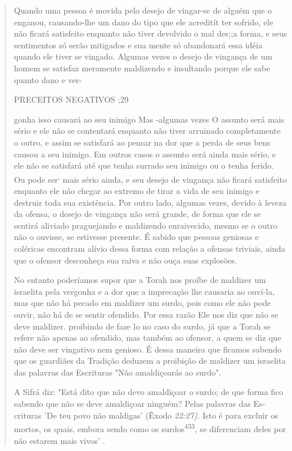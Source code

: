 \begin{quote}
Quando uma pessoa é movida pelo desejo de vingar-se de alguém que o
enganou, causando-lhe um dano do tipo que ele acreditít ter sofrido, ele
não ficará satisfeito enquanto não tiver devolvido o mal des;;a forma, e
seus sentimentos só serão mitigados e sua mente só abandonará essa idéia
quando ele tiver se vingado. Algumas vezes o desejo de vingança de um
homem se sa­tisfaz meramente maldizendo e insultando porque ele sabe
quanto dano e ver-

PRECEITOS NEGATIVOS ;29

gonha isso causará ao seu inimigo Mas -algumas vezes O assunto será mais
sério e ele não se contentará enquanto não tiver arruinado completamente
o outro, e assim se satisfará ao pensar na dor que a perda de seus bens
causou a seu inimigo. Em outros casos o assunto será ainda mais sério, e
ele não se satisfará até que tenha surrado seu inimigo ou o tenha
ferido. Ou pode ser\textsuperscript{,} mais sério ainda, e seu desejo de
vingança não ficará satisfeito enquanto ele não chegar ao extremo de
tirar a vida de seu inimigo e destruir toda sua existência. Por outro
lado, algumas vezes, devido à leveza da ofensa, o desejo de vingança não
será grande, de forma que ele se sentirá aliviado praguejando e
maldizendo enraivecido, mesmo se o outro não o ouvisse, se estivesse
pre­sente. É sabido que pessoas geniosas e coléricas encontram alívio
dessa forma com relação a ofensas triviais, ainda que o ofensor
desconheça sua raiva e não ouça suas explosões.

No entanto poderíamos supor que a Torah nos proíbe de maldizer um
israelita pela vergonha e a dor que a imprecação lhe causaria ao
ouví-la, mas que não há pecado em maldizer um surdo, pois como ele não
pode ouvir, não há de se sentir ofendido. Por essa razão Ele nos diz que
não se deve maldi­zer. proibindo de faze lo no caso do surdo, já que a
Torah se refere não apenas ao ofendido, mas também ao ofensor, a quem se
diz que não deve ser vingati­vo nem genioso. É dessa maneira que ficamos
sabendo que os guardiães da Tra­dição deduzem a proibição de maldizer um
israelita das palavras das Escrituras "Não amaldiçoarás ao surdo".

A Sifrá diz: "Está dito que não devo amaldiçoar o surdo; de que for­ma
fico sabendo que não se deve amaldiçoar ninguém? Pelas palavras das
Es­crituras 'De teu povo não maldigas' (Êxodo \emph{22:27).} Isto é para
excluir os mor­tos, os quais, embora sendo como os
surdos\textsuperscript{433}, se diferenciam deles por não estarem mais
vivos' .


\end{quote}

